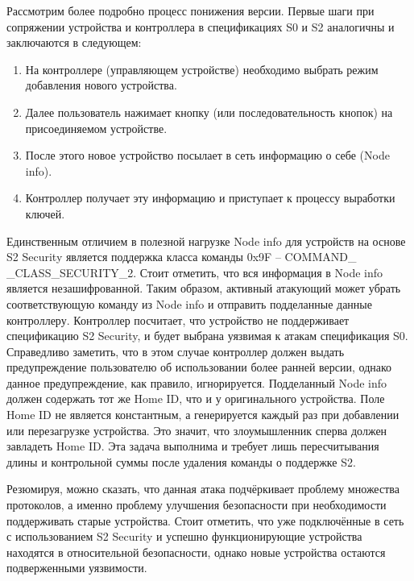 	Рассмотрим более подробно процесс понижения версии. Первые шаги при сопряжении устройства и 
	контроллера в спецификациях S0 и S2 аналогичны и заключаются в следующем:
	
	\begin{enumerate}
		\item На контроллере (управляющем устройстве) необходимо выбрать режим добавления нового
		устройства.
		\item Далее пользователь нажимает кнопку (или последовательность кнопок) на присоединяемом
		устройстве.
		\item После этого новое устройство посылает в сеть информацию о себе (Node info).
		\item Контроллер получает эту информацию и приступает к процессу выработки ключей.
	\end{enumerate}

	Единственным отличием в полезной нагрузке Node info для устройств на основе S2 Security является
	поддержка класса команды 0x9F – COMMAND\_ \newline \_CLASS\_SECURITY\_2. Стоит отметить, что
	вся информация в Node info является незашифрованной. Таким образом, активный атакующий может
	убрать соответствующую команду из Node info и отправить подделанные данные контроллеру. Контроллер
	посчитает, что устройство не поддерживает спецификацию S2 Security, и будет выбрана уязвимая к атакам
	спецификация S0. Справедливо заметить, что в этом случае контроллер должен выдать предупреждение
	пользователю об использовании более ранней версии, однако данное предупреждение, как правило,
	игнорируется. Подделанный Node info должен содержать тот же Home ID, что и у оригинального
	устройства. Поле Home ID не является константным, а генерируется каждый раз при добавлении или
	перезагрузке устройства. Это значит, что злоумышленник сперва должен завладеть Home ID. Эта
	задача выполнима и требует лишь пересчитывания длины и контрольной суммы после удаления команды 
	о поддержке S2.
	
	Резюмируя, можно сказать, что данная атака подчёркивает проблему множества протоколов, а именно
	проблему улучшения безопасности при необходимости поддерживать старые устройства. Стоит отметить,
	что уже подключённые в сеть с использованием S2 Security и успешно функционирующие устройства 
	находятся в относительной безопасности, однако новые устройства остаются подверженными уязвимости.
	
	
